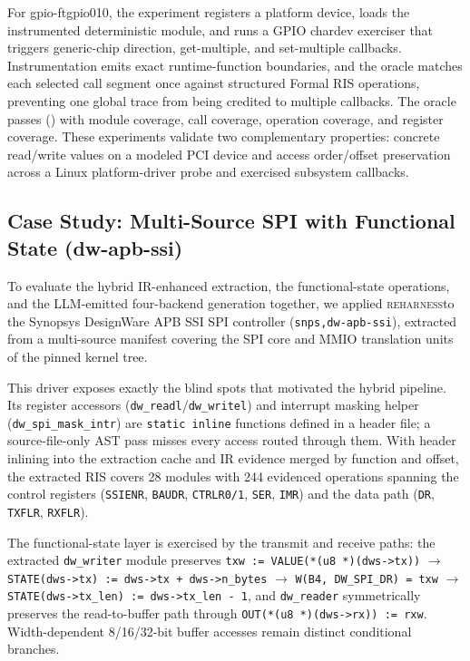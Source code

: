 \documentclass[sigplan, screen, review, anonymous]{acmart}
\newcommand{\reharness}{\textsc{reharness}}
\begin{document}
For gpio-ftgpio010, the experiment registers a platform device, loads the instrumented deterministic module, and runs a GPIO chardev exerciser that triggers generic-chip direction, get-multiple, and set-multiple callbacks. Instrumentation emits exact runtime-function boundaries, and the oracle matches each selected call segment once against structured Formal RIS operations, preventing one global trace from being credited to multiple callbacks. The oracle passes (\texttt{\FTQEMUOracle}) with \FTQEMUModuleCoverage{} module coverage, \FTQEMUCallCoverage{} call coverage, \FTQEMUOpCoverage{} operation coverage, and \FTQEMURegisterCoverage{} register coverage. These experiments validate two complementary properties: concrete read/write values on a modeled PCI device and access order/offset preservation across a Linux platform-driver probe and exercised subsystem callbacks.

\subsection{Case Study: Multi-Source SPI with Functional State (dw-apb-ssi)}

To evaluate the hybrid IR-enhanced extraction, the functional-state operations, and the LLM-emitted four-backend generation together, we applied \reharness to the Synopsys DesignWare APB SSI SPI controller (\texttt{snps,dw-apb-ssi}), extracted from a multi-source manifest covering the SPI core and MMIO translation units of the pinned kernel tree.

This driver exposes exactly the blind spots that motivated the hybrid pipeline. Its register accessors (\texttt{dw\_readl}/\texttt{dw\_writel}) and interrupt masking helper (\texttt{dw\_spi\_mask\_intr}) are \texttt{static inline} functions defined in a header file; a source-file-only AST pass misses every access routed through them. With header inlining into the extraction cache and IR evidence merged by function and offset, the extracted RIS covers 28 modules with 244 evidenced operations spanning the control registers (\texttt{SSIENR}, \texttt{BAUDR}, \texttt{CTRLR0/1}, \texttt{SER}, \texttt{IMR}) and the data path (\texttt{DR}, \texttt{TXFLR}, \texttt{RXFLR}).

The functional-state layer is exercised by the transmit and receive paths: the extracted \texttt{dw\_writer} module preserves \texttt{txw := VALUE(*(u8 *)(dws->tx))} $\rightarrow$ \texttt{STATE(dws->tx) := dws->tx + dws->n\_bytes} $\rightarrow$ \texttt{W(B4, DW\_SPI\_DR) = txw} $\rightarrow$ \texttt{STATE(dws->tx\_len) := dws->tx\_len - 1}, and \texttt{dw\_reader} symmetrically preserves the read-to-buffer path through \texttt{OUT(*(u8 *)(dws->rx)) := rxw}. Width-dependent 8/16/32-bit buffer accesses remain distinct conditional branches.
\end{document}
